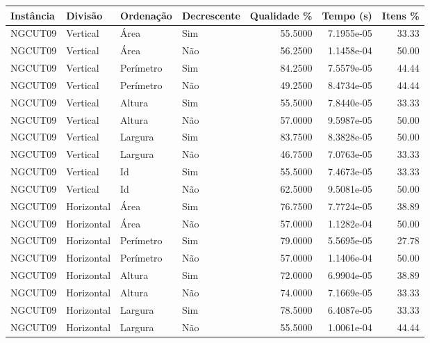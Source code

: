 \begin{tabular}{llllrrr}
    \hline
    Instância & Divisão     & Ordenação & Decrescente & Qualidade \% & Tempo (s)  & Itens \% \\
    \hline
    NGCUT09   & Vertical    & Área      & Sim         & 55.5000      & 7.1955e-05 & 33.33    \\
    NGCUT09   & Vertical    & Área      & Não         & 56.2500      & 1.1458e-04 & 50.00    \\
    NGCUT09   & Vertical    & Perímetro & Sim         & 84.2500      & 7.5579e-05 & 44.44    \\
    NGCUT09   & Vertical    & Perímetro & Não         & 49.2500      & 8.4734e-05 & 44.44    \\
    NGCUT09   & Vertical    & Altura    & Sim         & 55.5000      & 7.8440e-05 & 33.33    \\
    NGCUT09   & Vertical    & Altura    & Não         & 57.0000      & 9.5987e-05 & 50.00    \\
    NGCUT09   & Vertical    & Largura   & Sim         & 83.7500      & 8.3828e-05 & 50.00    \\
    NGCUT09   & Vertical    & Largura   & Não         & 46.7500      & 7.0763e-05 & 33.33    \\
    NGCUT09   & Vertical    & Id        & Sim         & 55.5000      & 7.4673e-05 & 33.33    \\
    NGCUT09   & Vertical    & Id        & Não         & 62.5000      & 9.5081e-05 & 50.00    \\
    NGCUT09   & Horizontal  & Área      & Sim         & 76.7500      & 7.7724e-05 & 38.89    \\
    NGCUT09   & Horizontal  & Área      & Não         & 57.0000      & 1.1282e-04 & 50.00    \\
    NGCUT09   & Horizontal  & Perímetro & Sim         & 79.0000      & 5.5695e-05 & 27.78    \\
    NGCUT09   & Horizontal  & Perímetro & Não         & 57.0000      & 1.1406e-04 & 50.00    \\
    NGCUT09   & Horizontal  & Altura    & Sim         & 72.0000      & 6.9904e-05 & 38.89    \\
    NGCUT09   & Horizontal  & Altura    & Não         & 74.0000      & 7.1669e-05 & 33.33    \\
    NGCUT09   & Horizontal  & Largura   & Sim         & 78.5000      & 6.4087e-05 & 33.33    \\
    NGCUT09   & Horizontal  & Largura   & Não         & 55.5000      & 1.0061e-04 & 44.44    \\

\end{tabular}
